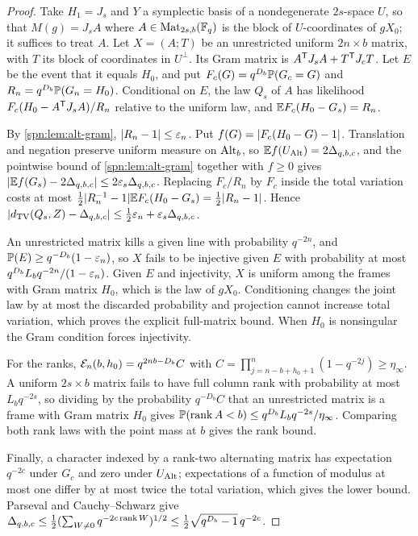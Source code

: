 \begin{proof}
Take $H_1=J_s$ and $Y$ a symplectic basis of a nondegenerate $2s$-space $U$, so that
$M(g)=J_sA$ where $A\in\operatorname{Mat}_{2s,b}(\mathbb{F}_q)$ is the block of $U$-coordinates of $gX_0$; it
suffices to treat $A$. Let $X=(A;T)$ be an unrestricted uniform $2n\times b$ matrix, with
$T$ its block of coordinates in $U^\perp$. Its Gram matrix is $A^{\mathsf{T}}J_sA+T^{\mathsf{T}}J_cT$.
Let $E$ be the event that it equals $H_0$, and put $F_c(G)=q^{D_b}\mathbb{P}(G_c=G)$ and
$R_n=q^{D_b}\mathbb{P}(G_n=H_0)$. Conditional on $E$, the law $Q_s$ of $A$ has likelihood
$F_c(H_0-A^{\mathsf{T}}J_sA)/R_n$ relative to the uniform law, and $\mathbb{E} F_c(H_0-G_s)=R_n$.

By \cref{spn:lem:alt-gram}, $\lvert R_n-1\rvert\le\varepsilon_n$. Put $f(G)=\lvert F_c(H_0-G)-1\rvert$. Translation
and negation preserve uniform measure on $\operatorname{Alt}_b$, so $\mathbb{E} f(U_{\operatorname{Alt}})=2\Delta_{q,b,c}$,
and the pointwise bound of \cref{spn:lem:alt-gram} together with $f\ge0$ gives
$\lvert\mathbb{E} f(G_s)-2\Delta_{q,b,c}\rvert\le2\varepsilon_s\Delta_{q,b,c}$. Replacing $F_c/R_n$ by $F_c$
inside the total variation costs at most
$\frac12\lvert R_n^{-1}-1\rvert\mathbb{E} F_c(H_0-G_s)=\frac12\lvert R_n-1\rvert$. Hence
$\lvert d_{\mathrm{TV}}(Q_s,Z)-\Delta_{q,b,c}\rvert\le\frac12\varepsilon_n+\varepsilon_s\Delta_{q,b,c}$.

An unrestricted matrix kills a given line with probability $q^{-2n}$, and
$\mathbb{P}(E)\ge q^{-D_b}(1-\varepsilon_n)$, so $X$ fails to be injective given $E$ with probability at
most $q^{D_b}L_bq^{-2n}/(1-\varepsilon_n)$. Given $E$ and injectivity, $X$ is uniform among the frames
with Gram matrix $H_0$, which is the law of $gX_0$. Conditioning changes the joint law by at
most the discarded probability and projection cannot increase total variation, which proves the
explicit full-matrix bound. When $H_0$ is nonsingular the Gram condition forces injectivity.

For the ranks, $\mathcal{E}_n(b,h_0)=q^{2nb-D_b}C$ with
$C=\prod_{j=n-b+h_0+1}^{n}(1-q^{-2j})\ge\eta_\infty$. A uniform $2s\times b$ matrix fails to
have full column rank with probability at most $L_bq^{-2s}$, so dividing by the probability
$q^{-D_b}C$ that an unrestricted matrix is a frame with Gram matrix $H_0$ gives
$\mathbb{P}(\operatorname{rank} A<b)\le q^{D_b}L_bq^{-2s}/\eta_\infty$. Comparing both rank laws with the point
mass at $b$ gives the rank bound.

Finally, a character indexed by a rank-two alternating matrix has expectation $q^{-2c}$ under
$G_c$ and zero under $U_{\operatorname{Alt}}$; expectations of a function of modulus at most one differ by
at most twice the total variation, which gives the lower bound. Parseval and Cauchy--Schwarz give
$\Delta_{q,b,c}\le\frac12(\sum_{W\ne0}q^{-2c\operatorname{rank} W})^{1/2}\le\frac12\sqrt{q^{D_b}-1}\,q^{-2c}$.
\end{proof}

